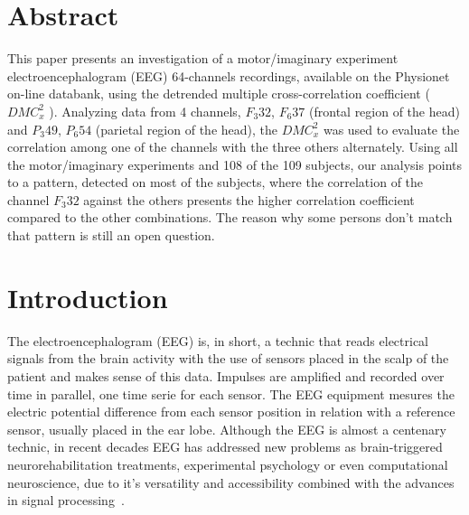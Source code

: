 \documentclass[10pt,letterpaper]{article}
\newcommand{\dmc}{\(DMC_x^2\) }
\begin{document}
\section*{Abstract}
This paper presents an investigation of a motor/imaginary experiment electroencephalogram (EEG) 64-channels recordings, available on the Physionet on-line databank, using the detrended multiple cross-correlation coefficient (\dmc). Analyzing data from 4 channels, \(F_{3}32\), \(F_{6}37\) (frontal region of the head) and \(P_{3}49\), \(P_{6}54\) (parietal region of the head), the \dmc was used to evaluate the correlation among one of the channels with the three others alternately. Using all the motor/imaginary experiments and 108 of the 109 subjects, our analysis points to a pattern, detected on most of the subjects, where the correlation of the channel \(F_{3}32\) against the others presents the higher correlation coefficient compared to the other combinations. The reason why some persons
don't match that pattern is still an open question.


\linenumbers

\section*{Introduction}

The electroencephalogram (EEG) is, in short, a technic that reads electrical signals from the brain activity with the use of sensors placed in the scalp of the patient and makes sense of this data. Impulses are amplified and recorded over time in parallel, one time serie for each sensor. The EEG equipment  mesures the electric potential difference from each sensor position in relation with a reference sensor, usually placed in the ear lobe. Although the EEG is almost a centenary technic, in recent decades EEG has addressed new problems as brain-triggered neurorehabilitation treatments, experimental psychology or even computational neuroscience, due to it's versatility and accessibility combined with the advances in signal processing~\cite{Biasiucci2019}.
\end{document}

